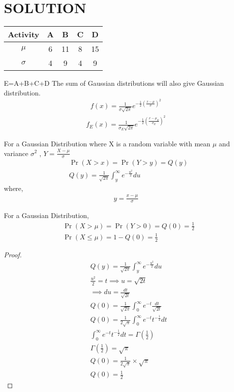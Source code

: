 \documentclass[journal,12pt,twocolumn]{IEEEtran}
\begin{document}
\section{SOLUTION}
\begin{table}[h!]
\centering
\begin{tabular}{|c||c|c|c|c|}
    \hline
    Activity & A& B& C& D \\
    \hline
    $\mu$ & 6& 11& 8& 15\\[1ex]
    \hline
   $\sigma$ & 4& 9& 4& 9\\[1ex]
    \hline
\end{tabular}
\end{table}
E=A+B+C+D
The sum of Gaussian distributions will also give Gaussian distribution.
\begin{align}
f(x)=\frac{1}{\sigma\sqrt{2\pi}}e^{-\frac{1}{2}\left(\frac{x-\mu}{\sigma}\right)^2}
\end{align}
\begin{align}
f_E(x)=\frac{1}{\sigma_E\sqrt{2\pi}}e^{-\frac{1}{2}\left(\frac{x-\mu_E}{\sigma_E}\right)^2}
\end{align}
\begin{definition}
For a Gaussian Distribution where X is a random variable with mean $\mu$ and variance $\sigma^2$ , $Y=\frac{X-\mu}{\sigma}$
\begin{align}
&\Pr(X>x)=\Pr(Y>y)=Q(y)\\
&Q(y)=\frac{1}{\sqrt{2\pi}}\int_{y}^{\infty}e^{-\frac{u^2}{2}}du
\end{align}
where,
\begin{align*}
y=\frac{x-\mu}{\sigma}
\end{align*}
\end{definition}
\begin{lemma}\label{Q(0)=0.5}
For a Gaussian Distribution,
\begin{align}
&\Pr(X>\mu)=\Pr(Y>0)=Q(0)=\frac{1}{2}\\
&\Pr(X\leq \mu)=1-Q(0)=\frac{1}{2}
\end{align}
\end{lemma}
\begin{proof}
\begin{align}
&Q(y)=\frac{1}{\sqrt{2\pi}}\int_{y}^{\infty}e^{-\frac{u^2}{2}}du\\
&\frac{u^2}{2}=t\implies u=\sqrt{2t}\\
&\implies du=\frac{dt}{\sqrt{2t}}\\
&Q(0)=\frac{1}{\sqrt{2\pi}}\int_{0}^{\infty}e^{-t}\frac{dt}{\sqrt{2t}}\\
&Q(0)=\frac{1}{2\sqrt{\pi}}\int_{0}^{\infty}e^{-t} t^{-\frac{1}{2}} dt\\
&\int_{0}^{\infty}e^{-t} t^{-\frac{1}{2}} dt=\Gamma(\frac{1}{2})\\
&\Gamma(\frac{1}{2})=\sqrt{\pi}\\
&Q(0)=\frac{1}{2\sqrt{\pi}}\times \sqrt{\pi}\\
&Q(0)=\frac{1}{2}
\end{align}
\end{proof}
\end{document}
